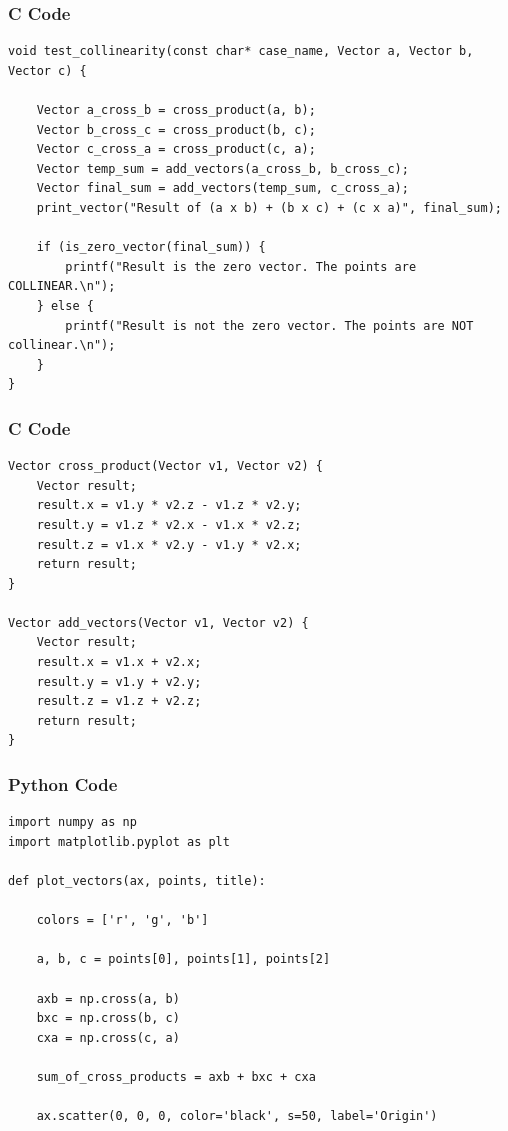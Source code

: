 \documentclass{beamer}
\begin{document}
\begin{frame}[fragile]
    \frametitle{C Code}

    \begin{lstlisting}
void test_collinearity(const char* case_name, Vector a, Vector b, Vector c) {
   
    Vector a_cross_b = cross_product(a, b);
    Vector b_cross_c = cross_product(b, c);
    Vector c_cross_a = cross_product(c, a);
    Vector temp_sum = add_vectors(a_cross_b, b_cross_c);
    Vector final_sum = add_vectors(temp_sum, c_cross_a);
    print_vector("Result of (a x b) + (b x c) + (c x a)", final_sum);

    if (is_zero_vector(final_sum)) {
        printf("Result is the zero vector. The points are COLLINEAR.\n");
    } else {
        printf("Result is not the zero vector. The points are NOT collinear.\n");
    }
}
    \end{lstlisting}
\end{frame}
\begin{frame}[fragile]
    \frametitle{C Code}

    \begin{lstlisting}
Vector cross_product(Vector v1, Vector v2) {
    Vector result;
    result.x = v1.y * v2.z - v1.z * v2.y;
    result.y = v1.z * v2.x - v1.x * v2.z;
    result.z = v1.x * v2.y - v1.y * v2.x;
    return result;
}

Vector add_vectors(Vector v1, Vector v2) {
    Vector result;
    result.x = v1.x + v2.x;
    result.y = v1.y + v2.y;
    result.z = v1.z + v2.z;
    return result;
}

    \end{lstlisting}
\end{frame}

\begin{frame}[fragile]
    \frametitle{Python Code}
    \begin{lstlisting}
import numpy as np
import matplotlib.pyplot as plt

def plot_vectors(ax, points, title):
   
    colors = ['r', 'g', 'b']
    
    a, b, c = points[0], points[1], points[2]

    axb = np.cross(a, b)
    bxc = np.cross(b, c)
    cxa = np.cross(c, a)
    
    sum_of_cross_products = axb + bxc + cxa
    
    ax.scatter(0, 0, 0, color='black', s=50, label='Origin')
    \end{lstlisting}
\end{frame}
\end{document}

